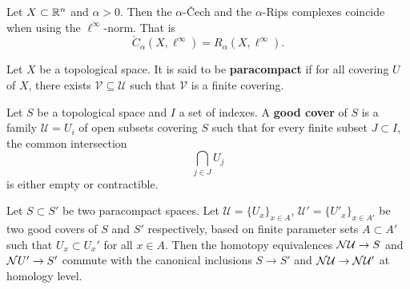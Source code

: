 \begin{lemma} \label{lemma:haus-aux-2}
    Let $ X \subset \mathbb R^n $ and $ \alpha > 0 $. Then the $\alpha$-\v Cech and the $\alpha$-Rips complexes coincide when using the $ \ell^\infty $-norm. That is
    $$
        \check C_\alpha(X, \ell^\infty) = R_\alpha(X, \ell^\infty).
    $$
\end{lemma}

\begin{definition}
    Let $ X $ be a topological space. It is said to be {\bf paracompact} if for all covering $ U $ of $ X $, there exists $ \mathcal V \subseteq \mathcal U $ such that $ \mathcal V $ is a finite covering.
\end{definition}

\begin{definition}
    Let $ S $ be a topological space and $ I $ a set of indexes. A {\bf good cover} of $ S $ is a family $ \mathcal U = {U_i} $ of open subsets covering $ S $ such that for every finite subset $ J \subset I $, the common intersection
    \begin{equation}
        \bigcap_{j\in J} U_j
    \end{equation}
    is either empty or contractible.
\end{definition}

\begin{lemma} \label{lemma:haus-aux-3}
    Let $ S \subset S' $ be two paracompact spaces. Let $ \mathcal U = \{U_x\}_{x \in A}$, $ \mathcal U' = \{U'_x\}_{x \in A'}$ be two good covers of $ S $ and $ S'$ respectively, based on finite parameter sets $ A \subset A ' $ such that $ U_x \subset U_x' $ for all $ x \in A $. Then the homotopy equivalences $ \mathcal{N} \mathcal U \to S $ and $\mathcal{N} U' \to S' $ commute with the canonical inclusions $ S \to S' $ and $ \mathcal{N} \mathcal U \to \mathcal{N} \mathcal U' $ at homology level.
\end{lemma}

